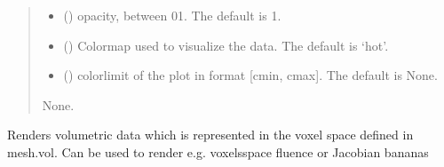 \documentclass[letterpaper,10pt,english]{sphinxmanual}
\begin{document}
\begin{fulllineitems}
\begin{fulllineitems}
\begin{quote}
\begin{description}
\begin{itemize}
\sphinxAtStartPar
Note that “=” is not supported. When “|” or “\&” are used, make sure that all conditions are put in parantheses separately

\sphinxAtStartPar
If not specified, function plots the outermost shell of the mesh.


\item {} 
\sphinxAtStartPar
{} (\sphinxstyleliteralemphasis{\sphinxupquote{, }}) \textendash{} opacity, between 0\sphinxhyphen{}1. The default is 1.

\item {} 
\sphinxAtStartPar
{} (\sphinxstyleliteralemphasis{\sphinxupquote{, }}) \textendash{} Colormap used to visualize the data. The default is ‘hot’.

\item {} 
\sphinxAtStartPar
{} (\sphinxstyleliteralemphasis{\sphinxupquote{, }}) \textendash{} colorlimit of the plot in format {[}cmin, cmax{]}. The default is None.

\end{itemize}

\sphinxAtStartPar
None.

\end{description}\end{quote}

\end{fulllineitems}


\begin{fulllineitems}
\label{\detokenize{_autosummary/nirfasterff.base.stnd_mesh.stndmesh:nirfasterff.base.stnd_mesh.stndmesh.plotvol}}
\pysigstartsignatures
\pysiglinewithargsret
{}
{\sphinxparamcomma {}\sphinxparamcomma {}\sphinxparamcomma {}\sphinxparamcomma {}\sphinxparamcomma {}}
{}
\pysigstopsignatures
\sphinxAtStartPar
Renders volumetric data which is represented in the voxel space defined in mesh.vol.
Can be used to render e.g. voxels\sphinxhyphen{}space fluence or Jacobian bananas


\end{fulllineitems}
\end{fulllineitems}
\end{document}
